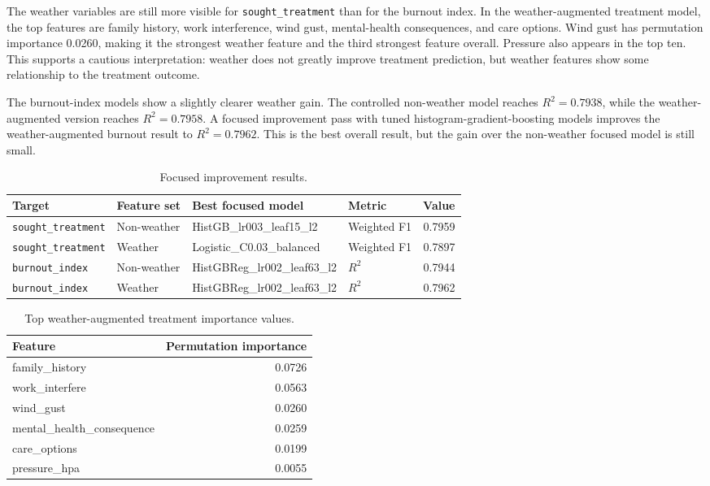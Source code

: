 \documentclass[10pt]{article}
\begin{document}
The weather variables are still more visible for \texttt{sought\_treatment} than for the burnout index. In the weather-augmented treatment model, the top features are family history, work interference, wind gust, mental-health consequences, and care options. Wind gust has permutation importance 0.0260, making it the strongest weather feature and the third strongest feature overall. Pressure also appears in the top ten. This supports a cautious interpretation: weather does not greatly improve treatment prediction, but weather features show some relationship to the treatment outcome.

The burnout-index models show a slightly clearer weather gain. The controlled non-weather model reaches $R^2=0.7938$, while the weather-augmented version reaches $R^2=0.7958$. A focused improvement pass with tuned histogram-gradient-boosting models improves the weather-augmented burnout result to $R^2=0.7962$. This is the best overall result, but the gain over the non-weather focused model is still small.

\begin{table}[H]
\centering
\small
\caption{Focused improvement results.}
\begin{tabular}{llllr}
\toprule
Target & Feature set & Best focused model & Metric & Value \\
\midrule
\texttt{sought\_treatment} & Non-weather & HistGB\_lr003\_leaf15\_l2 & Weighted F1 & 0.7959 \\
\texttt{sought\_treatment} & Weather & Logistic\_C0.03\_balanced & Weighted F1 & 0.7897 \\
\texttt{burnout\_index} & Non-weather & HistGBReg\_lr002\_leaf63\_l2 & $R^2$ & 0.7944 \\
\texttt{burnout\_index} & Weather & HistGBReg\_lr002\_leaf63\_l2 & $R^2$ & 0.7962 \\
\bottomrule
\end{tabular}
\end{table}

\begin{table}[H]
\centering
\small
\caption{Top weather-augmented treatment importance values.}
\begin{tabular}{lr}
\toprule
Feature & Permutation importance \\
\midrule
family\_history & 0.0726 \\
work\_interfere & 0.0563 \\
wind\_gust & 0.0260 \\
mental\_health\_consequence & 0.0259 \\
care\_options & 0.0199 \\
pressure\_hpa & 0.0055 \\
\bottomrule
\end{tabular}
\end{table}
\end{document}
